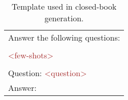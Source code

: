 
\begin{table}[t]
    \centering    

   \begin{tabularx}{\linewidth}{X}
    \toprule
    
\ttfamily
Answer the following questions: \\\\
\ttfamily
\textcolor{brown}{<few-shots>} \\\\
\ttfamily
Question: \textcolor{brown}{<question>} \\
\ttfamily
Answer:
\\
    \bottomrule
\end{tabularx}

    \caption{Template used in closed-book generation.}
    \label{template:cls}
\end{table}
